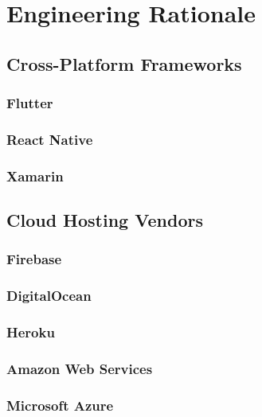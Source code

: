 \chapter{Engineering Rationale}

\section{Cross-Platform Frameworks}
\subsection{Flutter}

\subsection{React Native}

\subsection{Xamarin}


\section{Cloud Hosting Vendors}

\subsection{Firebase}

\subsection{DigitalOcean}

\subsection{Heroku}

\subsection{Amazon Web Services}

\subsection{Microsoft Azure}